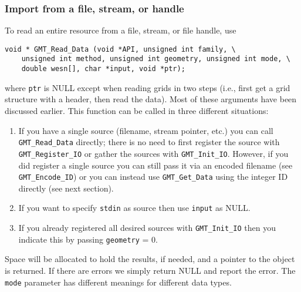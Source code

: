\documentclass[11pt]{report}
\begin{document}
\subsubsection{Import from a file, stream, or handle}
To read an entire resource from a file, stream, or file handle, use
\begin{verbatim}
void * GMT_Read_Data (void *API, unsigned int family, \
    unsigned int method, unsigned int geometry, unsigned int mode, \
    double wesn[], char *input, void *ptr);
\end{verbatim}
where \texttt{ptr} is NULL except when reading grids in two steps
(i.e., first get a grid structure with a header, then read the data).
Most of these arguments have been discussed earlier.  This function can
be called in three different situations:
\begin{enumerate}
\item If you have a single source (filename, stream pointer, etc.) you can call
\texttt{GMT\_Read\_Data} directly; there is no need to first register the source
with \texttt{GMT\_Register\_IO} or gather the sources with \texttt{GMT\_Init\_IO}.
However, if you did register a single source you can still pass it via an encoded
filename (see \texttt{GMT\_Encode\_ID}) or you can instead use \texttt{GMT\_Get\_Data}
using the integer ID directly (see next section).
\item If you want to specify \texttt{stdin} as source then use \texttt{input} as NULL.
\item If you already registered all desired sources with \texttt{GMT\_Init\_IO} then
you indicate this by passing \texttt{geometry} = 0.
\end{enumerate}
Space will be allocated to hold the results, if needed, and a pointer to the object is returned.
If there are errors we simply return NULL and report the error.
The \texttt{mode} parameter has different meanings for different data types.
\end{document}
